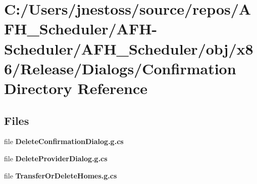 \section{C\+:/\+Users/jnestoss/source/repos/\+A\+F\+H\+\_\+\+Scheduler/\+A\+F\+H-\/\+Scheduler/\+A\+F\+H\+\_\+\+Scheduler/obj/x86/\+Release/\+Dialogs/\+Confirmation Directory Reference}
\label{dir_bc634827b021f779c735427e7013b3bb}
\subsection*{Files}
\begin{DoxyCompactItemize}
\item 
file \textbf{ Delete\+Confirmation\+Dialog.\+g.\+cs}
\item 
file \textbf{ Delete\+Provider\+Dialog.\+g.\+cs}
\item 
file \textbf{ Transfer\+Or\+Delete\+Homes.\+g.\+cs}
\end{DoxyCompactItemize}
